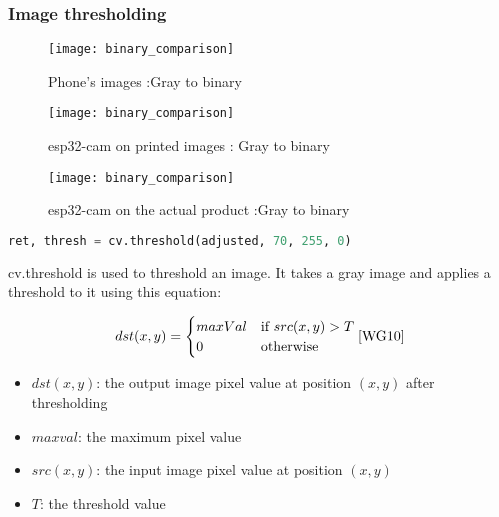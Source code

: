 \subsubsection{Image thresholding}

\FloatBarrier
\begin{figure}[h]
\FloatBarrier
         \centering
        \texttt{[image: binary\_comparison]}
   
        \caption{Phone's images :Gray to binary}
        \label{fig:Phone's images : Gray to binary}
\FloatBarrier
    \end{figure}


\FloatBarrier
\FloatBarrier
\begin{figure}[h]
\FloatBarrier
         \centering
        \texttt{[image: binary\_comparison]}
   
        \caption{esp32-cam on printed images : Gray to binary}
        \label{fig:Phone's images : Gray to binary}
\FloatBarrier
    \end{figure}


\FloatBarrier
\FloatBarrier
\begin{figure}[h]
\FloatBarrier
         \centering
        \texttt{[image: binary\_comparison]}
   
        \caption{esp32-cam on the actual product :Gray to binary}
        \label{fig:Phone's images :  Gray to binary}
\FloatBarrier
    \end{figure}


\FloatBarrier 
\begin{lstlisting}[language=Python]
 ret, thresh = cv.threshold(adjusted, 70, 255, 0)
\end{lstlisting}
 cv.threshold is used to threshold an image. It takes a gray image and applies a threshold to it \cite{WG10} using this equation:

\begin{equation}
dst(x,y) = \begin{cases}
maxVal &\text{if } src(x,y) > T \\
0 &\text{otherwise}
\end{cases}
\cite{WG10}
\end{equation}
\begin{itemize}
\item $dst(x,y)$: the output image pixel value at position $(x,y)$ after thresholding
\item $maxval$: the maximum pixel value 
\item $src(x,y)$: the input image pixel value at position $(x,y)$
\item $T$: the threshold value 
\end{itemize}

